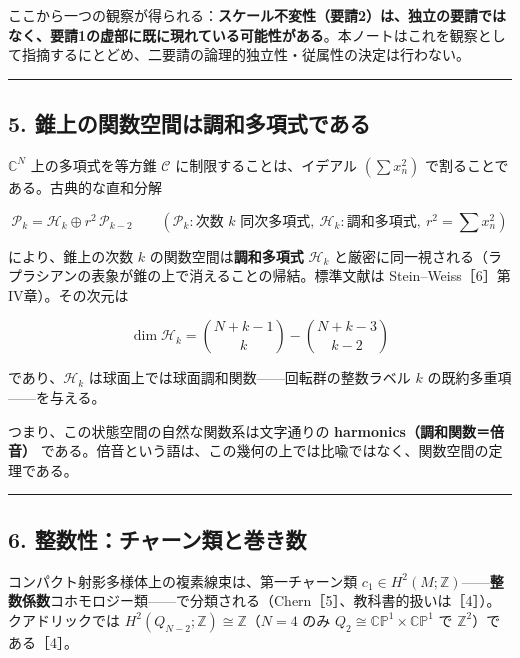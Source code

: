 \documentclass[
  a4paper,
]{ltjsarticle}
\begin{document}
ここから一つの観察が得られる：\textbf{スケール不変性（要請2）は、独立の要請ではなく、要請1の虚部に既に現れている可能性がある}。本ノートはこれを観察として指摘するにとどめ、二要請の論理的独立性・従属性の決定は行わない。

\begin{center}\rule{0.5\linewidth}{0.5pt}\end{center}

\subsection{5.
錐上の関数空間は調和多項式である}\label{ux9310ux4e0aux306eux95a2ux6570ux7a7aux9593ux306fux8abfux548cux591aux9805ux5f0fux3067ux3042ux308b}

\(\mathbb C^N\) 上の多項式を等方錐 \(\mathcal C\)
に制限することは、イデアル \((\sum x_n^2)\)
で割ることである。古典的な直和分解

\[
\mathcal P_k=\mathcal H_k\oplus r^2\,\mathcal P_{k-2}
\qquad(\mathcal P_k:\text{次数 }k\text{ 同次多項式},\ \mathcal H_k:\text{調和多項式},\ r^2=\textstyle\sum x_n^2)
\]

により、錐上の次数 \(k\) の関数空間は\textbf{調和多項式}
\(\mathcal H_k\)
と厳密に同一視される（ラプラシアンの表象が錐の上で消えることの帰結。標準文献は
Stein--Weiss［6］第IV章）。その次元は

\[
\dim\mathcal H_k=\binom{N+k-1}{k}-\binom{N+k-3}{k-2}
\]

であり、\(\mathcal H_k\)
は球面上では球面調和関数------回転群の整数ラベル \(k\)
の既約多重項------を与える。

つまり、この状態空間の自然な関数系は文字通りの
\textbf{harmonics（調和関数＝倍音）}
である。倍音という語は、この幾何の上では比喩ではなく、関数空間の定理である。

\begin{center}\rule{0.5\linewidth}{0.5pt}\end{center}

\subsection{6.
整数性：チャーン類と巻き数}\label{ux6574ux6570ux6027ux30c1ux30e3ux30fcux30f3ux985eux3068ux5dfbux304dux6570}

コンパクト射影多様体上の複素線束は、第一チャーン類
\(c_1\in H^2(M;\mathbb Z)\)------\textbf{整数係数}コホモロジー類------で分類される（Chern［5］、教科書的扱いは［4］）。クアドリックでは
\(H^2(Q_{N-2};\mathbb Z)\cong\mathbb Z\)（\(N=4\) のみ
\(Q_2\cong\mathbb{CP}^1\times\mathbb{CP}^1\) で
\(\mathbb Z^2\)）である［4］。
\end{document}
